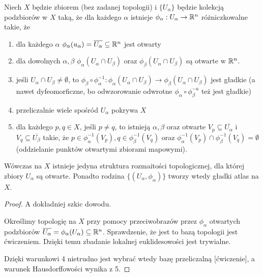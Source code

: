\begin{lemma}
  Niech $X$ będzie zbiorem (bez zadanej topologii) i $\{U_\alpha\}$ będzie kolekcją podzbiorów w $X$ taką, że dla każdego $\alpha$ istnieje $\phi_\alpha:U_\alpha\to\mathbb{R}^n$ różniczkowalne takie, że
  
  \begin{enumerate}
    \item dla każdego $\alpha$ $\phi_\alpha(u_\alpha)=\overline{U_\alpha}\subseteq\mathbb{R}^n$ jest otwarty
    \item dla dowolnych $\alpha, \beta$ $\phi_\alpha(U_\alpha\cap U_\beta)$ oraz $\phi_\beta(U_\alpha\cap U_\beta)$ są otwarte w $\mathbb{R}^n$.
    \item jeśli $U_\alpha\cap U_\beta\neq\emptyset$, to $\phi_\beta\circ\phi_\alpha^{-1}:\phi_\alpha(U_\alpha\cap U_\beta)\to\phi_\beta(U_\alpha\cap U_\beta)$ jest gładkie (a nawet dyfeomorficzne, bo odwzorowanie odwrotne $\phi_\alpha\circ\phi_\beta^{-a}$ też jest gładkie)
    \item przeliczalnie wiele spośród $U_\alpha$ pokrywa $X$
    \item dla każdego $p, q\in X$, jeśli $p\neq q$, to istnieją $\alpha, \beta$ oraz otwarte $V_p\subseteq\overline{U_\alpha}$ i $V_q\subseteq\overline{U_\beta}$ takie, że $p\in \phi_\alpha^{-1}(V_p), q\in\phi_\beta^{-1}(V_q)$ oraz $\phi_\alpha^{-1}(V_p)\cap\phi_\beta^{-1}(V_q)=\emptyset$ (oddzielanie punktów otwartymi zbiorami mapowymi).
  \end{enumerate}

  Wówczas na $X$ istnieje jedyna struktura rozmaitości topologicznej, dla której zbiory $U_\alpha$ są otwarte. Ponadto rodzina $\{(U_\alpha, \phi_\alpha)\}$ tworzy wtedy gładki atlas na $X$.
\end{lemma}

\begin{proof}
  A dokładniej szkic dowodu. 

  Określimy topologię na $X$ przy pomocy przeciwobrazów przez $\phi_\alpha$ otwartych podzbiorów $\overline{U_\alpha}=\phi_\alpha(U_\alpha)\subseteq\mathbb{R}^n$. Sprawdzenie, że jest to bazą topologii jest ćwiczeniem. Dzięki temu zbadanie lokalnej euklidesowości jest trywialne.

  Dzięki warunkowi 4 nietrudno jest wybrać wtedy bazę przeliczalną [ćwiczenie], a warunek Hausdorffowości wynika z 5.
\end{proof}

